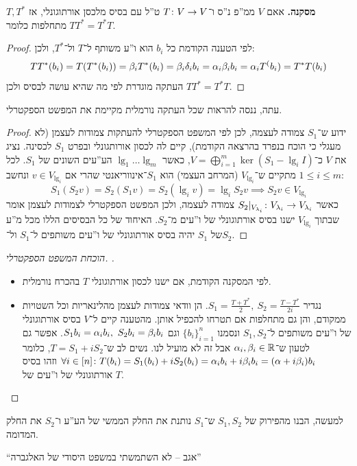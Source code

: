 \documentclass[]{../../../../tex/classes/styledArticle}
\begin{document}
	\textbf{מסקנה. }אאם $V$ ממ''פ נ''ס ו־$T \colon V \to V$ ט''ל עם בסיס מלכסן אורתוגונלי, אז $T, T^*$ מתחלפות כלומר $TT^* = T^*T$. \begin{proof}
		לפי הטענה הקודמת כל $b_i$ הוא ו''ע משותף ל־$T$ ול־$T^*$, ולכן: 
		\[ TT^*(b_i) = T(T^*(b_i)) = \beta_i T^*(b_i) = \beta_i \delta_i b_i = \alpha_i \beta_i b_i = \alpha_i T^(b_i) = T^*T(b_i) \]
		העתקה מוגדרת לפי מה שהיא עושה לבסיס ולכן $TT^* = T^*T$. 
	\end{proof}
	
	עתה, ננסה להראות שכל העתקה נורמלית מקיימת את המפשט הספקטרלי. 
	
	\begin{proof}
		ידוע ש־$S_1$ צמודה לעצמה, לכן לפי המשפט הספקטרלי להעתקות צמודות לעצמן (לא מעגלי כי הוכח בנפרד בהרצאה הקודמת), קיים לה לכסון אורותגונלי ובפרט $S_1$ לכסינה. נציג את $V$ כ־$V = \bigoplus_{i = 1}^{m} \ker(S_1 - \lg_iI)$, כאשר $\lg _1 \dots \lg_m$ הע''עים השונים של $S_1$. לכל $1 \le i \le m$  מתקיים ש־$V_{\lg_i}$ (המרחב העצמי) הוא $S_1$־אינווריאנטי שהרי אם $v \in V_{\lg_i}$ ונחשב: 
		\[ S_1(S_2 v) = S_2(S_1 v) = S_2(\lg_i v) = \lg _i S_2v \implies S_2 v \in V_{\lg_i} \]
		כאשר $S_2|_{V_{\lambda _i}} \colon V_{\lambda_i} \to V_{\lambda_i}$ צמודה לעצמה, ולכן המפשט הספקטרלי לצמודות לעצמן אומר שבתוך $V_{\lg_i}$ ישנו בסיס אורתוגונלי של ו''עים מ־$S_2$. האיחוד של כל הבסיסים הללו מכל מ''ע של $S_1$ יהיה בסיס אורתוגונלי של ו''עים משותפים ל־$S_1$ ול־$S_2$. 
	\end{proof}
	\begin{proof}[הוכחת המשפט הספקטרלי. ]\,
		\begin{itemize}
			\item[$\implies$] לפי המסקנה הקודמת, אם ישנו לכסון אורתוגונלי $T$ בהכרח נורמלית. 
			\item[$\impliedby$] נגדיר $S_1 = \frac{T + T^*}{2}, \ S_2 = \frac{T - T^*}{2i}$. הן וודאי צמודות לעצמן מהלינאריות וכל השטויות ממקודם, והן גם מתחלפות אם תטרחו להכפיל אותן. מהטענה קיים ל־$V$ בסיס אורתוגונלי של ו''עים משותפים ל־$S_1, S_2$ ונסמנו $\{b_i\}^{n}_{i = 1}$ וגם $S_1b_i = \alpha_i b_i, \ S_2b_i= \beta_i b_i$. אפשר גם לטעון ש־$\alpha_i, \beta_i \in \mathbb{R}$ אבל זה לא מועיל לנו. נשים לב ש־$T = S_1 + iS_2$, כלומר $\forall i \in [n] \colon T(b_i) = S_1(b_i) + iS_2(b_i) = \alpha_i b_i + i\beta_i b_i = (\alpha + i\beta_i)b_i$ וזהו בסיס אורתוגונלי של ו''עים של $T$. 
		\end{itemize}
	\end{proof}
	
	למעשה, הבנו מהפירוק של $S_1, S_2$ ש־$S_1$ נותנת את החלק הממשי של הע''ע ו־$S_2$ את החלק המדומה. 
	
	``אגב – לא השתמשתי במשפט היסודי של האלגברה''
	
	
	
	
	\ndoc
\end{document}
